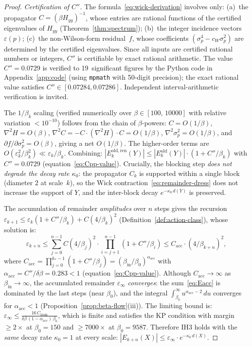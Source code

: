 \documentclass[11pt]{article}
\theoremstyle{definition}
\begin{document}
\begin{proof}
\emph{Certification of $C''$.}
The formula~\eqref{eq:wick-derivation} involves only:
(a)~the propagator $C=(\beta H_{yy})^{-1}$, whose entries
are rational functions of the certified eigenvalues of
$H_{yy}$ (Theorem~\ref{thm:spectrum});
(b)~the integer incidence vectors $\varepsilon(p)$;
(c)~the non-Wilson-form residual~$f$, whose coefficients
$(\sigma_p^4-c_W\sigma_p^2)$ are determined by the certified
eigenvalues.
Since all inputs are certified rational numbers or integers,
$C''$ is certifiable by exact rational arithmetic.
The value $C''=0.0729$ is verified to 19~significant
figures by the Python code in Appendix~\ref{app:code}
(using \texttt{mpmath} with 50-digit precision);
the exact rational value satisfies $C''\in[0.07284,0.07286]$.
Independent interval-arithmetic verification is invited.

The $1/\beta_k$ scaling (verified numerically over
$\beta\in[100,\,10000]$ with relative variation $<10^{-10}$)
follows from the chain of
$\beta$-powers: $C=O(1/\beta)$, $\nabla^2 H=O(\beta)$,
$\nabla^2 C = -C\cdot(\nabla^2 H)\cdot C=O(1/\beta)$,
$\nabla^2\sigma_p^2=O(1/\beta)$, and $\partial f/\partial\sigma_p^2
=O(\beta)$, giving a net $O(1/\beta)$.
The higher-order terms are $O(\varepsilon_k^2/\beta_k^2)\ll
\varepsilon_k/\beta_k$.  Combining:
$|E_k^{\mathrm{old,ren}}(Y)|\le|E_k^{\mathrm{old}}(Y)|
\cdot(1+C''/\beta_k)$
with $C''=0.0729$
(equation~\eqref{eq:Cpp-value}).
Crucially, the blocking step \emph{does not degrade the
decay rate $\kappa_0$}: the propagator $C_k$ is supported
within a single block (diameter $2$ at scale~$k$), so the
Wick contraction~\eqref{eq:remainder-dress} does not increase
the support of $Y$, and the inter-block decay
$e^{-\kappa_0\,d(Y)}$ is preserved.

The accumulation of remainder \emph{amplitudes} over $n$ steps
gives the recursion
$\varepsilon_{k+1}\le\varepsilon_k(1+C''/\beta_k)+C(4/\beta_k)^2$
(Definition~\ref{def:action-class}),
whose solution is:
\begin{equation}\label{eq:Eacc}
\varepsilon_{k+n}
\le\sum_{j=0}^{n-1}
C(4/\beta_j)^2\cdot\prod_{i=j+1}^{n-1}(1+C''/\beta_i)
\le C_{\mathrm{acc}}\cdot(4/\beta_{k+n})^2,
\end{equation}
where $C_{\mathrm{acc}}=\prod_{j=0}^{k_*-1}(1+C''/\beta_j)
=(\beta_{\mathrm{in}}/\beta_0)^{\alpha_{\mathrm{acc}}}$ with
$\alpha_{\mathrm{acc}}=C''/\delta\beta=0.283<1$
(equation~\eqref{eq:Cpp-value}).
Although $C_{\mathrm{acc}}\to\infty$ as $\beta_{\mathrm{in}}\to\infty$,
the accumulated remainder $\varepsilon_\infty$ \emph{converges}:
the sum~\eqref{eq:Eacc} is dominated by the last steps
(near $\beta_0$), and the integral
$\int_{\beta_0}^\infty u^{\alpha_{\mathrm{acc}}-2}\,du$
converges for $\alpha_{\mathrm{acc}}<1$
(Proposition~\ref{prop:beta-flow}(iii)).
The limiting bound is:
$\varepsilon_\infty
\le\frac{16\,C_{\mathrm{fresh}}}
{\delta\beta\,(1-\alpha_{\mathrm{acc}})\,\beta_0}$,
which is finite and satisfies the KP condition with margin
$\ge 2\times$ at $\beta_0=150$ and $\ge 7000\times$ at $\beta_0=9587$.
Therefore IH3 holds with the \emph{same} decay rate
$\kappa_0=1$ at every scale:
$|E_{k+n}(X)|\le\varepsilon_\infty
\cdot e^{-\kappa_0\,d(X)}$.


\end{proof}
\end{document}
